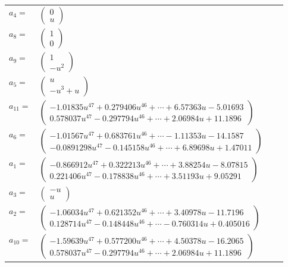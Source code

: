 \documentclass[1p]{elsarticle_modified}
\theoremstyle{definition}
\begin{document}
\begin{tabular}{m{7pt} m{180pt} m{7pt} m{180pt} }
\flushright $a_{4}=$&$\begin{pmatrix}0\\u\end{pmatrix}$ \\
\flushright $a_{8}=$&$\begin{pmatrix}1\\0\end{pmatrix}$ \\
\flushright $a_{9}=$&$\begin{pmatrix}1\\- u^2\end{pmatrix}$ \\
\flushright $a_{5}=$&$\begin{pmatrix}u\\- u^3+u\end{pmatrix}$ \\
\flushright $a_{11}=$&$\begin{pmatrix}-1.01835 u^{47}+0.279406 u^{46}+\cdots+6.57363 u-5.01693\\0.578037 u^{47}-0.297794 u^{46}+\cdots+2.06984 u+11.1896\end{pmatrix}$ \\
\flushright $a_{6}=$&$\begin{pmatrix}-1.01567 u^{47}+0.683761 u^{46}+\cdots-1.11353 u-14.1587\\-0.0891298 u^{47}-0.145158 u^{46}+\cdots+6.89698 u+1.47011\end{pmatrix}$ \\
\flushright $a_{1}=$&$\begin{pmatrix}-0.866912 u^{47}+0.322213 u^{46}+\cdots+3.88254 u-8.07815\\0.221406 u^{47}-0.178838 u^{46}+\cdots+3.51193 u+9.05291\end{pmatrix}$ \\
\flushright $a_{3}=$&$\begin{pmatrix}- u\\u\end{pmatrix}$ \\
\flushright $a_{2}=$&$\begin{pmatrix}-1.06034 u^{47}+0.621352 u^{46}+\cdots+3.40978 u-11.7196\\0.128714 u^{47}-0.148448 u^{46}+\cdots-0.760314 u+0.405016\end{pmatrix}$ \\
\flushright $a_{10}=$&$\begin{pmatrix}-1.59639 u^{47}+0.577200 u^{46}+\cdots+4.50378 u-16.2065\\0.578037 u^{47}-0.297794 u^{46}+\cdots+2.06984 u+11.1896\end{pmatrix}$ \\

\end{tabular}
\end{document}
